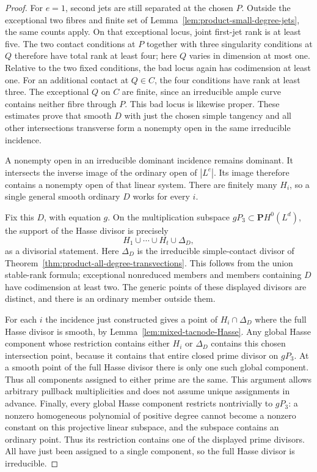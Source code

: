 \begin{proof}
For $e=1$, second jets are still separated at the chosen $P$.
Outside the exceptional two fibres and finite set of
Lemma~\ref{lem:product-small-degree-jets}, the same
counts apply. On that exceptional locus, joint first-jet rank
is at least five. The two contact conditions at $P$ together
with three singularity conditions at $Q$ therefore have total
rank at least four; here $Q$ varies in dimension at most one.
Relative to the two fixed conditions, the bad locus again has
codimension at least one. For an additional contact at $Q\in C$,
the four conditions have rank at least three. The exceptional
$Q$ on $C$ are finite, since an irreducible ample curve contains
neither fibre through $P$. This bad locus is likewise proper.
These estimates prove that smooth $D$ with just the chosen
simple tangency and all other intersections transverse form a
nonempty open in the same irreducible incidence.

A nonempty open in an irreducible dominant incidence remains
dominant. It intersects the inverse image of the ordinary open
of $|L^e|$. Its image therefore contains a nonempty open of that
linear system. There are finitely many $H_i$, so a single general
smooth ordinary $D$ works for every $i$.

Fix this $D$, with equation $g$. On the multiplication subspace
$gP_3\subset\mathbf P H^0(L^d)$, the support of the Hasse divisor
is precisely
\[
                      H_1\cup\cdots\cup H_t\cup\Delta_D,
\]
as a divisorial statement. Here $\Delta_D$ is the irreducible
simple-contact divisor of
Theorem~\ref{thm:product-all-degree-transvections}.
This follows from the union stable-rank formula; exceptional
nonreduced members and members containing $D$ have codimension
at least two. The generic points of these displayed divisors
are distinct, and there is an ordinary member outside them.

For each $i$ the incidence just constructed gives a point of
$H_i\cap\Delta_D$ where the full Hasse divisor is smooth, by
Lemma~\ref{lem:mixed-tacnode-Hasse}. Any global Hasse component whose restriction contains either
$H_i$ or $\Delta_D$ contains this chosen intersection point,
because it contains that entire closed prime divisor on $gP_3$.
At a smooth point of the full Hasse divisor there is only one
such global component. Thus all components assigned to either
prime are the same. This argument allows arbitrary pullback
multiplicities and does not assume unique assignments in
advance.
Finally, every global Hasse component restricts nontrivially
to $gP_3$: a nonzero homogeneous polynomial of positive degree
cannot become a nonzero constant on this projective linear
subspace, and the subspace contains an ordinary point.
Thus its restriction contains one of the displayed prime
divisors. All have just been assigned to a single component,
so the full Hasse divisor is irreducible.
\end{proof}



